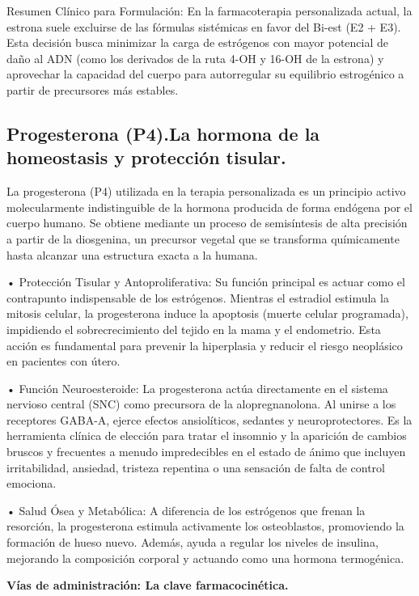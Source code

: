 \documentclass[
  spanish,
]{article}
\begin{document}
Resumen Clínico para Formulación: En la farmacoterapia personalizada actual, la estrona suele excluirse de las fórmulas sistémicas en favor del Bi-est (E2 + E3). Esta decisión busca minimizar la carga de estrógenos con mayor potencial de daño al ADN (como los derivados de la ruta 4-OH y 16-OH de la estrona) y aprovechar la capacidad del cuerpo para autorregular su equilibrio estrogénico a partir de precursores más estables.

\subsection{Progesterona (P4).La hormona de la homeostasis y protección tisular.}\label{progesterona-p4.la-hormona-de-la-homeostasis-y-protecciuxf3n-tisular.}

La progesterona (P4) utilizada en la terapia personalizada es un principio activo molecularmente indistinguible de la hormona producida de forma endógena por el cuerpo humano. Se obtiene mediante un proceso de semisíntesis de alta precisión a partir de la diosgenina, un precursor vegetal que se transforma químicamente hasta alcanzar una estructura exacta a la humana.

• Protección Tisular y Antoproliferativa: Su función principal es actuar como el contrapunto indispensable de los estrógenos. Mientras el estradiol estimula la mitosis celular, la progesterona induce la apoptosis (muerte celular programada), impidiendo el sobrecrecimiento del tejido en la mama y el endometrio. Esta acción es fundamental para prevenir la hiperplasia y reducir el riesgo neoplásico en pacientes con útero.

• Función Neuroesteroide: La progesterona actúa directamente en el sistema nervioso central (SNC) como precursora de la alopregnanolona. Al unirse a los receptores GABA-A, ejerce efectos ansiolíticos, sedantes y neuroprotectores. Es la herramienta clínica de elección para tratar el insomnio y la aparición de cambios bruscos y frecuentes a menudo impredecibles en el estado de ánimo que incluyen irritabilidad, ansiedad, tristeza repentina o una sensación de falta de control emociona.

• Salud Ósea y Metabólica: A diferencia de los estrógenos que frenan la resorción, la progesterona estimula activamente los osteoblastos, promoviendo la formación de hueso nuevo. Además, ayuda a regular los niveles de insulina, mejorando la composición corporal y actuando como una hormona termogénica.

\textbf{Vías de administración: La clave farmacocinética.}
\end{document}
